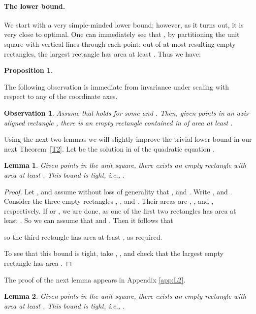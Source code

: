 \documentclass[11pt]{article}
\newtheorem{lemma}{Lemma}
\newtheorem{proposition}{Proposition}
\newtheorem{observation}{Observation}
\begin{document}
\paragraph{The lower bound.}
We start with a very simple-minded lower bound; however, as it turns
out, it is very close to optimal.
One can immediately see that , by
partitioning the unit square with vertical lines through each point:
out of at most  resulting empty rectangles, the largest rectangle
has area at least . Thus we have:

\begin{proposition} \label{P1}

\end{proposition}


The following observation is immediate from invariance under scaling 
with respect to any of the coordinate axes. 

\begin{observation} \label{O1}
Assume that  holds for some  and .
Then, given  points in an axis-aligned rectangle , there is an empty
rectangle contained in  of area at least . 
\end{observation}



Using the next two lemmas we will slightly improve the trivial lower bound
 in  our next Theorem~\ref{T2}. 
Let   be the solution in  of the
quadratic equation . 


\begin{lemma} \label{L1}
Given  points in the unit square, there exists an empty rectangle
with area at least . 
This bound is tight, i.e., .
\end{lemma}
\begin{proof}
Let , and assume without loss of generality
that , and  . Write
, and . 
Consider the three empty rectangles ,
, and
.
Their areas are , , and , respectively. 
If  or ,
we are done, as one of the first two rectangles has area at least
. So we can assume that  and .
Then it follows that

so the third rectangle has area at least , as required.

To see that this bound is tight, take ,
, and check that the largest empty rectangle has area . 
\end{proof}

The proof of the next lemma appears in Appendix \ref{app:L2}.

\begin{lemma} \label{L2}
Given  points in the unit square, there exists an empty rectangle
with area at least . This bound is tight, i.e.,
.  
\end{lemma}
\end{document}
